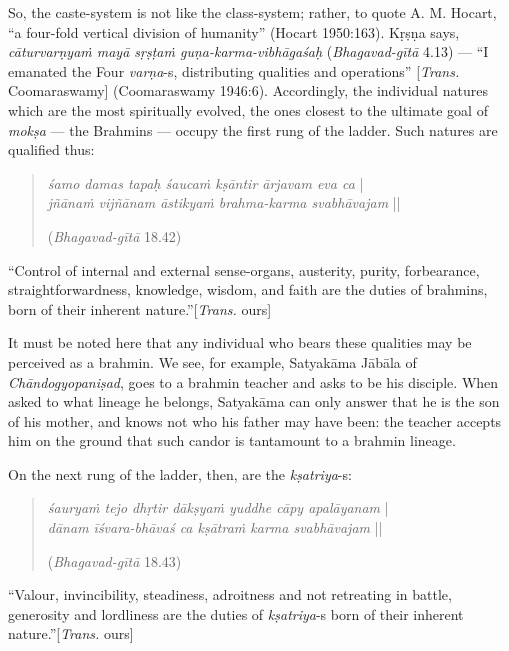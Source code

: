 So, the caste-system is not like the class-system; rather, to quote A. M. Hocart, “a four-fold vertical division of humanity” (Hocart 1950:163). Kṛṣṇa says, {\sl cāturvarṇyaṁ mayā sṛṣṭaṁ guṇa-karma-vibhāgaśaḥ} ({\sl Bhagavad-gītā} 4.13) --- ``I emanated the Four {\sl varṇa}-s, distributing qualities and operations'' [{\sl Trans.} Coomaraswamy] (Coomaraswamy 1946:6). Accordingly, the individual natures which are the most spiritually evolved, the ones closest to the ultimate goal of {\sl mokṣa} --- the Brahmins --- occupy the first rung of the ladder. Such natures are qualified thus:
\begin{quote}
{{\sl śamo damas tapaḥ śaucaṁ kṣāntir ārjavam eva ca}} |\\
{\sl jñānaṁ vijñānam āstikyaṁ brahma-karma svabhāvajam} || 

\hfill ({\sl Bhagavad-gītā} 18.42)
\end{quote}

\begin{myquote}
“Control of internal and external sense-organs, austerity, purity, forbearance, straightforwardness, knowledge, wisdom, and faith are the duties of brahmins, born of their inherent nature.”\hfill [{\sl Trans.} ours]
\end{myquote}

It must be noted here that any individual who bears these qualities may be perceived as a brahmin. We see, for example, Satyakāma Jābāla of {\sl Chāndogyopaniṣad}, goes to a brahmin teacher and asks to be his disciple. When asked to what lineage he belongs, Satyakāma can only answer that he is the son of his mother, and knows not who his father may have been: the teacher accepts him on the ground that such candor is tantamount to a brahmin lineage. 

On the next rung of the ladder, then, are the {\sl kṣatriya}-s:
\begin{quote}
{{\sl śauryaṁ tejo dhṛtir dākṣyaṁ yuddhe cāpy apalāyanam}} |\\
{\sl dānam īśvara-bhāvaś ca kṣātraṁ karma svabhāvajam} || 

\hfill ({\sl Bhagavad-gītā} 18.43)
\end{quote}

\begin{myquote}
“Valour, invincibility, steadiness, adroitness and not retreating in battle, generosity and lordliness are the duties of {\sl kṣatriya}-s born of their inherent nature.”\hfill [{\sl Trans.} ours]
\end{myquote}

